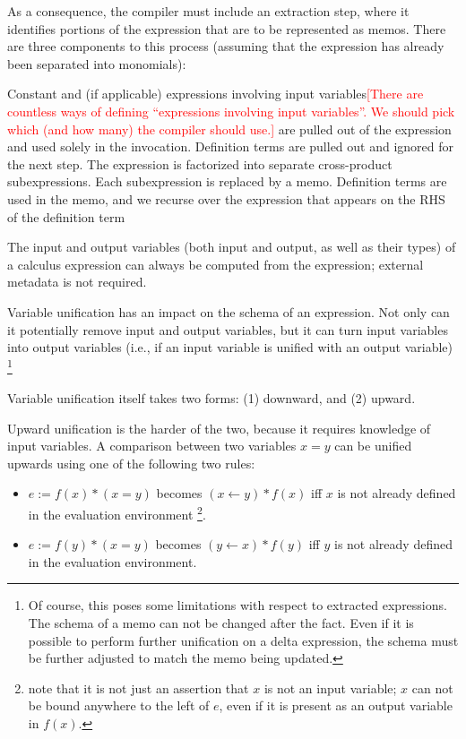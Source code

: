 \documentclass[11pt]{amsart}
\newcommand{\todo}[1]{\textcolor{red}{[#1]}}
\newcommand{\parsection}[1]{\smallskip\noindent{\bf #1.}}
\begin{document}
As a consequence, the compiler must include an extraction step, where it identifies portions of the expression that are to be represented as memos.  There are three components to this process (assuming that the expression has already been separated into monomials):

\begin{algorithmic}[1]
\STATE Constant and (if applicable) expressions involving input variables\todo{There are countless ways of defining ``expressions involving input variables''.  We should pick which (and how many) the compiler should use.} are pulled out of the expression and used solely in the invocation.
\STATE Definition terms are pulled out and ignored for the next step.
\STATE The expression is factorized into separate cross-product subexpressions. Each subexpression is replaced by a memo.
\STATE Definition terms are used in the memo, and we recurse over the expression that appears on the RHS of the definition term
\end{algorithmic}

\parsection{Variable Unification}
The input and output variables (both input and output, as well as their types) of a calculus expression can always be computed from the expression; external metadata is not required.  

Variable unification has an impact on the schema of an expression.  Not only can it potentially remove input and output variables, but it can turn input variables into output variables (i.e., if an input variable is unified with an output variable) \footnote{Of course, this poses some limitations with respect to extracted expressions.  The schema of a memo can not be changed after the fact.  Even if it is possible to perform further unification on a delta expression, the schema must be further adjusted to match the memo being updated.}

Variable unification itself takes two forms: (1) downward, and (2) upward.  

Upward unification is the harder of the two, because it requires knowledge of input variables.  A comparison between two variables $x = y$ can be unified upwards using one of the following two rules:
\begin{itemize}
\item $e := f(x) * (x = y)$ becomes $(x \gets y) * f(x)$ iff $x$ is not already defined in the evaluation environment \footnote{note that it is not just an assertion that $x$ is not an input variable; $x$ can not be bound anywhere to the left of $e$, even if it is present as an output variable in $f(x)$.}.
\item $e := f(y) * (x = y)$ becomes $(y \gets x) * f(y)$ iff $y$ is not already defined in the evaluation environment.
\end{itemize}
\end{document}
